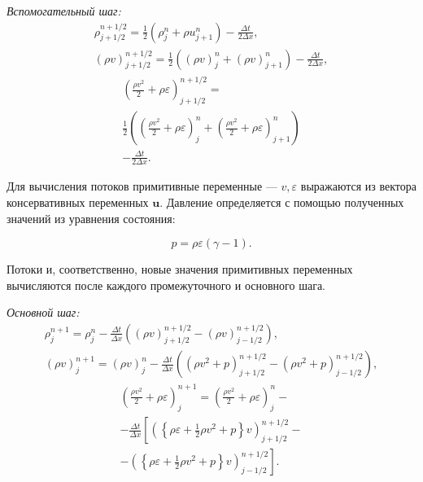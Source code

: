 \documentclass[a4paper]{article}
\begin{document}
	\textit{Вспомогательный шаг:}
	\begin{gather}\label{HydroHelper}
	\rho_{j+1/2}^{n+1/2} = \frac{1}{2} \left(\rho_{j}^{n} + \rho{u}_{j+1}^{n}\right)
		- \frac{\Delta t}{2 \Delta x}	,	\\
	(\rho v)_{j+1/2}^{n+1/2} = \frac{1}{2} \left((\rho v)_{j}^{n} + (\rho v)_{j+1}^{n}\right)
	- \frac{\Delta t}{2 \Delta x}		,						
	\end{gather}
	\begin{multline}
		\left(\frac{\rho v^2}{2} + \rho \varepsilon	\right)_{j+1/2}^{n+1/2} = \\
		\frac{1}{2} \left(\left(\frac{\rho v^2}{2} + \rho \varepsilon	\right)_{j}^{n} 
		+ \left(\frac{\rho v^2}{2} + \rho \varepsilon	\right)_{j+1}^{n}\right) \\
		- \frac{\Delta t}{2 \Delta x}	.
	\end{multline}
	
	Для вычисления потоков примитивные переменные --- $v, \varepsilon$ выражаются из вектора консервативных переменных $\mathbf{u}$. Давление определяется с помощью полученных значений из уравнения состояния:
	
	\begin{equation}
		p = \rho \varepsilon (\gamma -1).
	\end{equation}
	
	Потоки и, соответственно, новые значения примитивных переменных вычисляются после каждого промежуточного и основного шага.
	
	\textit{Основной шаг:}
	\begin{gather}\label{HydroMain}
	\rho_{j}^{n+1} = \rho_{j}^{n} - \frac{\Delta t}{\Delta x} \left(
		(\rho v)_{j+1/2}^{n+1/2} - (\rho v)_{j-1/2}^{n+1/2}				 \right) , \\
	(\rho v)_{j}^{n+1} = (\rho v)_{j}^{n} - \frac{\Delta t}{\Delta x} \left(
		(\rho v^2 + p)_{j+1/2}^{n+1/2} - (\rho v^2 + p)_{j-1/2}^{n+1/2}				 \right) ,
	\end{gather}
	\begin{multline}
		\left(\frac{\rho v^2}{2} + \rho \varepsilon	\right)_{j}^{n+1} = 
		\left(\frac{\rho v^2}{2} + \rho \varepsilon	\right)_{j}^{n} -
		\\ - \frac{\Delta t}{\Delta x} \left[
		\left(\left\{\rho \varepsilon + \frac{1}{2}\rho v^2 + p\right\}v\right)_{j+1/2}^{n+1/2} - \right. 
		\\\left. - \left(\left\{\rho \varepsilon + \frac{1}{2}\rho v^2 + p\right\}v\right)_{j-1/2}^{n+1/2} \right] .
	\end{multline}
	
\end{document}
